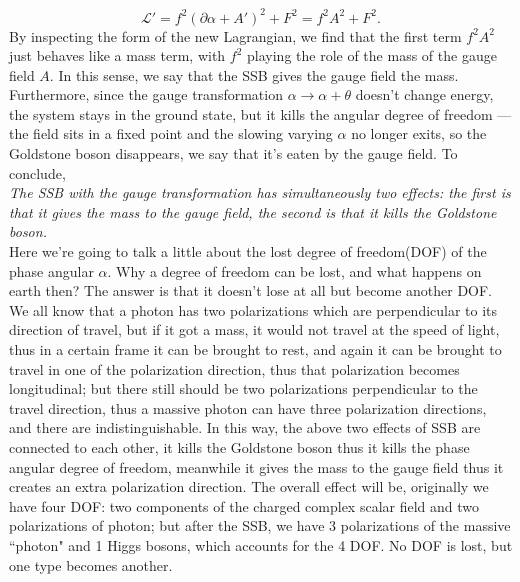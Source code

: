 \documentclass{article}
\newcommand{\be}{\begin{equation}}
\newcommand{\ee}{\end{equation}}
\newcommand{\p}{\partial}
\renewcommand{\1}{\left}
\renewcommand{\2}{\right}
\newcommand{\ma}{\mathcal}
\newcommand{\al}{\alpha}
\renewcommand{\th}{\theta}
\begin{document}
\be
\ma L'=f^2 (\p\al+A')^2+F^2=f^2 A^2+F^2.
\ee
By inspecting the form of the new Lagrangian, we find that the first term $f^2 A^2$ just behaves like a mass term, with $f^2$ playing the role of the mass of the gauge  field $A$. In this sense, we say that the SSB gives the gauge field the mass. Furthermore, since the gauge transformation $\al\rightarrow \al+\th$ doesn't change energy, the system stays in the ground state, but it kills the angular degree of freedom --- the field sits in a fixed point and the slowing varying $\al$ no longer exits, so the Goldstone boson disappears, we say that it's eaten by the gauge field. To conclude,\\

\textit{The SSB with the gauge transformation has simultaneously two effects: the first is that it gives the mass to the gauge field, the second is that it kills the Goldstone boson.}\\

Here we're going to talk a little about the lost degree of freedom(DOF) of the phase angular $\al$. Why a degree of freedom can be lost, and what happens on earth then? The answer is that it doesn't lose at all but become another DOF. We all know that a photon has two polarizations which are perpendicular to its direction of travel, but if it got a mass, it would not travel at the speed of light, thus in a certain frame it can be brought to rest, and again it can be brought to travel in one of the polarization direction, thus that polarization becomes longitudinal; but there still should be two polarizations perpendicular to the travel direction, thus a massive photon can have three polarization directions, and there are indistinguishable. In this way, the above two effects of SSB are connected to each other, it kills the Goldstone boson thus it kills the phase angular degree of freedom, meanwhile it gives the mass to the gauge field thus it creates an extra polarization direction. The overall effect will be, originally we have four DOF: two components of the charged complex scalar field and two polarizations of photon; but after the SSB, we have 3 polarizations of the massive ``photon" and 1 Higgs bosons, which accounts for the 4 DOF. No DOF is lost, but one type becomes another.\\
\end{document}
